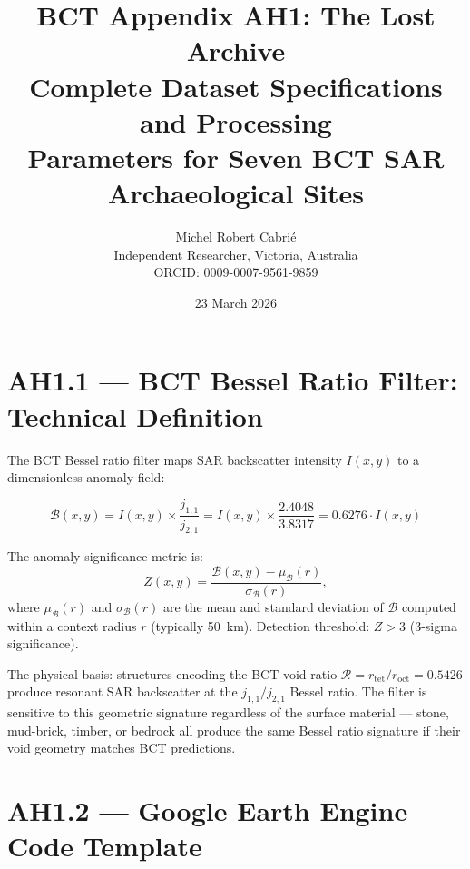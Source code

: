 \documentclass[12pt,twocolumn]{article}
\title{\textbf{\color{bctnavy}BCT Appendix AH1: The Lost Archive}\\
{\large\color{bctblue}Complete Dataset Specifications and Processing\\
Parameters for Seven BCT SAR Archaeological Sites}}
\author{Michel Robert Cabri\'{e}\\
{\small Independent Researcher, Victoria, Australia}\\
{\small ORCID: 0009-0007-9561-9859}}
\date{23 March 2026}
\begin{document}

\section{AH1.1 --- BCT Bessel Ratio Filter: Technical Definition}

The BCT Bessel ratio filter maps SAR backscatter intensity
$I(x,y)$ to a dimensionless anomaly field:

\begin{equation}
\mathcal{B}(x,y) = I(x,y) \times \frac{j_{1,1}}{j_{2,1}}
= I(x,y) \times \frac{2.4048}{3.8317} = 0.6276 \cdot I(x,y)
\end{equation}

The anomaly significance metric is:
\begin{equation}
Z(x,y) = \frac{\mathcal{B}(x,y) - \mu_\mathcal{B}(r)}
{\sigma_\mathcal{B}(r)},
\end{equation}
where $\mu_\mathcal{B}(r)$ and $\sigma_\mathcal{B}(r)$ are
the mean and standard deviation of $\mathcal{B}$ computed
within a context radius $r$ (typically 50~km). Detection
threshold: $Z > 3$ (3-sigma significance).

The physical basis: structures encoding the BCT void ratio
$\mathcal{R} = r_\mathrm{tet}/r_\mathrm{oct} = 0.5426$
produce resonant SAR backscatter at the $j_{1,1}/j_{2,1}$
Bessel ratio. The filter is sensitive to this geometric
signature regardless of the surface material --- stone,
mud-brick, timber, or bedrock all produce the same
Bessel ratio signature if their void geometry matches
BCT predictions.

\section{AH1.2 --- Google Earth Engine Code Template}
\end{document}
